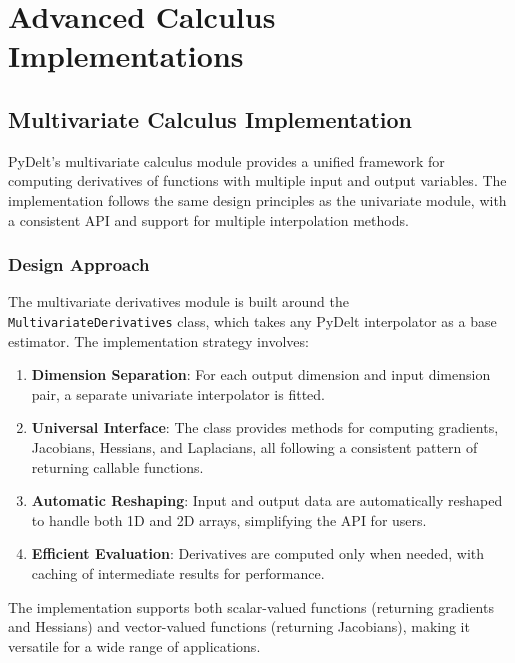 \documentclass[11pt,a4paper]{article}
\begin{document}
\section{Advanced Calculus Implementations}

\subsection{Multivariate Calculus Implementation}

PyDelt's multivariate calculus module provides a unified framework for computing derivatives of functions with multiple input and output variables. The implementation follows the same design principles as the univariate module, with a consistent API and support for multiple interpolation methods.

\subsubsection{Design Approach}

The multivariate derivatives module is built around the \texttt{MultivariateDerivatives} class, which takes any PyDelt interpolator as a base estimator. The implementation strategy involves:

\begin{enumerate}
    \item \textbf{Dimension Separation}: For each output dimension and input dimension pair, a separate univariate interpolator is fitted.
    
    \item \textbf{Universal Interface}: The class provides methods for computing gradients, Jacobians, Hessians, and Laplacians, all following a consistent pattern of returning callable functions.
    
    \item \textbf{Automatic Reshaping}: Input and output data are automatically reshaped to handle both 1D and 2D arrays, simplifying the API for users.
    
    \item \textbf{Efficient Evaluation}: Derivatives are computed only when needed, with caching of intermediate results for performance.
\end{enumerate}

The implementation supports both scalar-valued functions (returning gradients and Hessians) and vector-valued functions (returning Jacobians), making it versatile for a wide range of applications.
\end{document}
